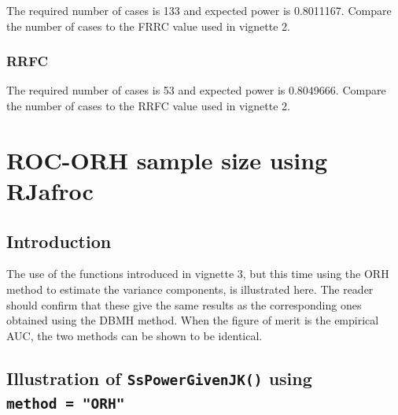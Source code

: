 \documentclass[]{book}
\newenvironment{Shaded}{\begin{snugshade}}{\end{snugshade}}
\newcommand{\CommentTok}[1]{\textcolor[rgb]{0.56,0.35,0.01}{\textit{#1}}}
\newcommand{\DataTypeTok}[1]{\textcolor[rgb]{0.13,0.29,0.53}{#1}}
\newcommand{\DecValTok}[1]{\textcolor[rgb]{0.00,0.00,0.81}{#1}}
\newcommand{\KeywordTok}[1]{\textcolor[rgb]{0.13,0.29,0.53}{\textbf{#1}}}
\newcommand{\NormalTok}[1]{#1}
\newcommand{\StringTok}[1]{\textcolor[rgb]{0.31,0.60,0.02}{#1}}
\begin{document}
The required number of cases is 133 and expected power is 0.8011167. Compare the number of cases to the FRRC value used in vignette 2.

\hypertarget{rrfc}{%
\subsection{RRFC}\label{rrfc}}

\begin{Shaded}
\end{Shaded}

The required number of cases is 53 and expected power is 0.8049666. Compare the number of cases to the RRFC value used in vignette 2.

\hypertarget{SSRocORHRJafroc}{%
\chapter{ROC-ORH sample size using RJafroc}\label{SSRocORHRJafroc}}

\hypertarget{introduction-9}{%
\section{Introduction}\label{introduction-9}}

The use of the functions introduced in vignette 3, but this time using the ORH method to estimate the variance components, is illustrated here. The reader should confirm that these give the same results as the corresponding ones obtained using the DBMH method. When the figure of merit is the empirical AUC, the two methods can be shown to be identical.

\hypertarget{illustration-of-sspowergivenjk-using-method-orh}{%
\section{\texorpdfstring{Illustration of \texttt{SsPowerGivenJK()} using \texttt{method\ =\ "ORH"}}{Illustration of SsPowerGivenJK() using method = "ORH"}}\label{illustration-of-sspowergivenjk-using-method-orh}}
\end{document}
